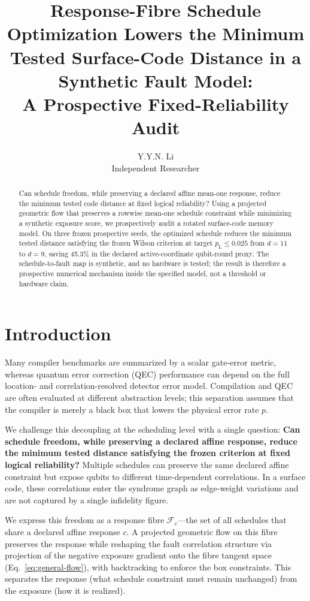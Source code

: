 \documentclass[11pt]{article}
\title{\textbf{Response-Fibre Schedule Optimization Lowers the Minimum Tested Surface-Code Distance in a Synthetic Fault Model:}\\
A Prospective Fixed-Reliability Audit}
\author{Y.Y.N. Li\\
\small Independent Researcher}
\date{}
\newcommand{\pL}{p_{\mathrm L}}
\newcommand{\F}{\mathcal{F}}
\begin{document}
\maketitle

\begin{abstract}
Can schedule freedom, while preserving a declared affine mean-one response, reduce the minimum tested code distance at fixed logical reliability? Using a projected geometric flow that preserves a rowwise mean-one schedule constraint while minimizing a synthetic exposure score, we prospectively audit a rotated surface-code memory model. On three frozen prospective seeds, the optimized schedule reduces the minimum tested distance satisfying the frozen Wilson criterion at target \(\pL \le 0.025\) from \(d=11\) to \(d=9\), saving 45.3\% in the declared active-coordinate qubit-round proxy. The schedule-to-fault map is synthetic, and no hardware is tested; the result is therefore a prospective numerical mechanism inside the specified model, not a threshold or hardware claim.
\end{abstract}

\section{Introduction}

Many compiler benchmarks are summarized by a scalar gate-error metric, whereas quantum error correction (QEC) performance can depend on the full location- and correlation-resolved detector error model. Compilation and QEC are often evaluated at different abstraction levels; this separation assumes that the compiler is merely a black box that lowers the physical error rate \(p\).

We challenge this decoupling at the scheduling level with a single question: \textbf{Can schedule freedom, while preserving a declared affine response, reduce the minimum tested distance satisfying the frozen criterion at fixed logical reliability?} Multiple schedules can preserve the same declared affine constraint but expose qubits to different time-dependent correlations. In a surface code, these correlations enter the syndrome graph as edge-weight variations and are not captured by a single infidelity figure.

We express this freedom as a response fibre \(\F_c\)---the set of all schedules that share a declared affine response \(c\). A projected geometric flow on this fibre preserves the response while reshaping the fault correlation structure via projection of the negative exposure gradient onto the fibre tangent space (Eq.~\eqref{eq:general-flow}), with backtracking to enforce the box constraints. This separates the response (what schedule constraint must remain unchanged) from the exposure (how it is realized).
\end{document}
